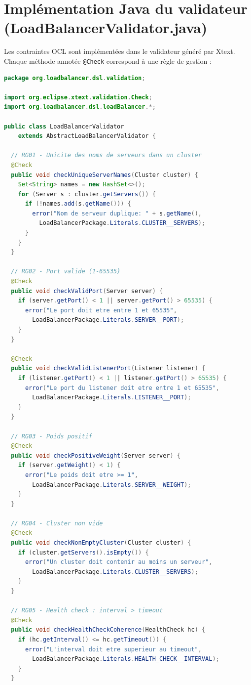 \documentclass[12pt,a4paper]{report}
\begin{document}
\section{Implémentation Java du validateur (LoadBalancerValidator.java)}

Les contraintes OCL sont implémentées dans le validateur généré par Xtext. Chaque méthode annotée \texttt{@Check} correspond à une règle de gestion :

\begin{lstlisting}[language=Java, caption={LoadBalancerValidator.java -- Méthodes de validation}]
package org.loadbalancer.dsl.validation;

import org.eclipse.xtext.validation.Check;
import org.loadbalancer.dsl.loadBalancer.*;

public class LoadBalancerValidator
    extends AbstractLoadBalancerValidator {

  // RG01 - Unicite des noms de serveurs dans un cluster
  @Check
  public void checkUniqueServerNames(Cluster cluster) {
    Set<String> names = new HashSet<>();
    for (Server s : cluster.getServers()) {
      if (!names.add(s.getName())) {
        error("Nom de serveur duplique: " + s.getName(),
          LoadBalancerPackage.Literals.CLUSTER__SERVERS);
      }
    }
  }

  // RG02 - Port valide (1-65535)
  @Check
  public void checkValidPort(Server server) {
    if (server.getPort() < 1 || server.getPort() > 65535) {
      error("Le port doit etre entre 1 et 65535",
        LoadBalancerPackage.Literals.SERVER__PORT);
    }
  }

  @Check
  public void checkValidListenerPort(Listener listener) {
    if (listener.getPort() < 1 || listener.getPort() > 65535) {
      error("Le port du listener doit etre entre 1 et 65535",
        LoadBalancerPackage.Literals.LISTENER__PORT);
    }
  }

  // RG03 - Poids positif
  @Check
  public void checkPositiveWeight(Server server) {
    if (server.getWeight() < 1) {
      error("Le poids doit etre >= 1",
        LoadBalancerPackage.Literals.SERVER__WEIGHT);
    }
  }

  // RG04 - Cluster non vide
  @Check
  public void checkNonEmptyCluster(Cluster cluster) {
    if (cluster.getServers().isEmpty()) {
      error("Un cluster doit contenir au moins un serveur",
        LoadBalancerPackage.Literals.CLUSTER__SERVERS);
    }
  }

  // RG05 - Health check : interval > timeout
  @Check
  public void checkHealthCheckCoherence(HealthCheck hc) {
    if (hc.getInterval() <= hc.getTimeout()) {
      error("L'interval doit etre superieur au timeout",
        LoadBalancerPackage.Literals.HEALTH_CHECK__INTERVAL);
    }
  }


\end{lstlisting}
\end{document}

